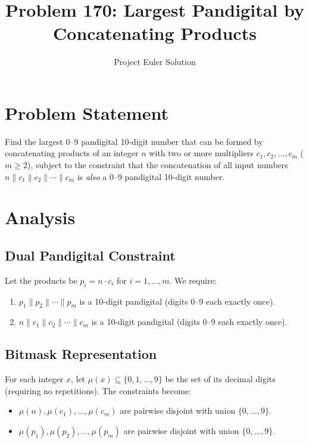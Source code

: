 \documentclass[11pt]{article}
\title{Problem 170: Largest Pandigital by Concatenating Products}
\author{Project Euler Solution}
\date{}
\begin{document}
\maketitle

\section{Problem Statement}
Find the largest 0--9 pandigital 10-digit number that can be formed by concatenating products of an integer $n$ with two or more multipliers $c_1, c_2, \ldots, c_m$ ($m \ge 2$), subject to the constraint that the concatenation of all input numbers $n \| c_1 \| c_2 \| \cdots \| c_m$ is \emph{also} a 0--9 pandigital 10-digit number.

\section{Analysis}

\subsection{Dual Pandigital Constraint}
Let the products be $p_i = n \cdot c_i$ for $i = 1, \ldots, m$. We require:
\begin{enumerate}
    \item $p_1 \| p_2 \| \cdots \| p_m$ is a 10-digit pandigital (digits 0--9 each exactly once).
    \item $n \| c_1 \| c_2 \| \cdots \| c_m$ is a 10-digit pandigital (digits 0--9 each exactly once).
\end{enumerate}

\subsection{Bitmask Representation}
For each integer $x$, let $\mu(x) \subseteq \{0,1,\ldots,9\}$ be the set of its decimal digits (requiring no repetitions). The constraints become:
\begin{itemize}
    \item $\mu(n), \mu(c_1), \ldots, \mu(c_m)$ are pairwise disjoint with union $\{0,\ldots,9\}$.
    \item $\mu(p_1), \mu(p_2), \ldots, \mu(p_m)$ are pairwise disjoint with union $\{0,\ldots,9\}$.
\end{itemize}
\end{document}
